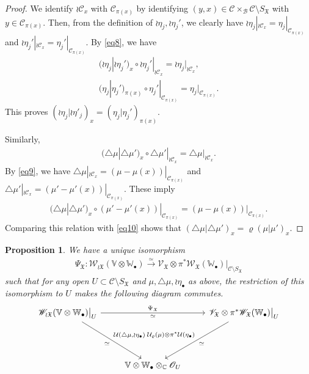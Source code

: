 \documentclass[12pt,a4paper,notitlepage]{article}
\theoremstyle{definition}
\theoremstyle{plain}
\newtheorem{pp}[df]{Proposition}
\newcommand{\fk}{\mathfrak}
\newcommand{\mc}{\mathcal}
\newcommand{\scr}{\mathscr}
\newcommand{\SX}{{S_{\fk X}}}
\newcommand{\blt}{\bullet}
\newcommand{\Vbb}{\mathbb V}
\newcommand{\Wbb}{\mathbb W}
\newcommand{\Cbb}{\mathbb C}
\numberwithin{equation}{section}
\begin{document}
\begin{proof}
We identify $\wr\mc C_x$ with $\mc C_{\pi(x)}$ by identifying $(y,x)\in\mc C\times_{\mc B}\mc C\setminus\SX$ with $y\in\mc C_{\pi(x)}$. Then, from the definition of $\wr\eta_j,\wr\eta_j'$, we clearly have $\wr\eta_j|_{\wr\mc C_x}=\eta_j|_{\mc C_{\pi(x)}}$ and $\wr\eta_j'|_{\wr\mc C_x}=\eta_j'|_{\mc C_{\pi(x)}}$. By \eqref{eq8}, we have
\begin{gather*}
(\wr\eta_j|\wr\eta_j')_x\circ\wr\eta_j'|_{\wr\mc C_x}=\wr\eta_j|_{\wr\mc C_x},\\
(\eta_j|\eta_j')_{\pi(x)}\circ\eta_j'|_{\mc C_{\pi(x)}}=\eta_j|_{\mc C_{\pi(x)}}.
\end{gather*}
This proves $(\wr\eta_j|\wr\eta'_j)_x=(\eta_j|\eta_j')_{\pi(x)}$. 

Similarly, 
\begin{gather*}
(\triangle\mu|\triangle\mu')_x\circ\triangle\mu'|_{\wr\mc C_x}=\triangle\mu|_{\wr\mc C_x}.
\end{gather*}
By \eqref{eq9}, we have $\triangle\mu|_{\wr\mc C_x}=(\mu-\mu(x))|_{\mc C_{\pi(x)}}$ and $\triangle\mu'|_{\wr\mc C_x}=(\mu'-\mu'(x))|_{\mc C_{\pi(x)}}$. These imply
\begin{gather*}
(\triangle\mu|\triangle\mu')_x\circ(\mu'-\mu'(x))|_{\mc C_{\pi(x)}}=(\mu-\mu(x))|_{\mc C_{\pi(x)}}.
\end{gather*}
Comparing this relation with \eqref{eq10} shows that $(\triangle\mu|\triangle\mu')_x=\varrho(\mu|\mu')_x$.
\end{proof}











\begin{pp}\label{lb5}
We have a unique isomorphism
\begin{align}
\Psi_{\fk X}:\scr W_{\wr\fk X}(\Vbb\otimes\Wbb_\blt)\xrightarrow{\simeq} \scr V_{\fk X}\otimes\pi^*\scr W_{\fk X}(\Wbb_\blt)\big|_{\mc C\setminus\SX}\label{eq32}	
\end{align}
such that for any open $U\subset\mc C\setminus\SX$ and $\mu,\triangle\mu,\wr\eta_\blt$ as above, the restriction of this isomorphism to $U$ makes the following diagram commutes.
\begin{equation}
\begin{tikzcd}
\scr W_{\wr\fk X}(\Vbb\otimes\Wbb_\blt)\big|_U \arrow[rr,"\simeq"',"\Psi_{\fk X}"] \arrow[ddr, "\simeq"' ,"{\mc U(\triangle\mu,\wr\eta_\blt)}"]  && \scr V_{\fk X}\otimes\pi^*\scr W_{\fk X}(\Wbb_\blt)\big |_U \arrow[ddl,"\simeq","{\mc U_\varrho(\mu)\otimes\pi^*\mc U(\eta_\blt)}"']\\
{}\\
& \Vbb\otimes\Wbb_\blt\otimes_\Cbb \scr O_U
\end{tikzcd}\label{eq26}	
\end{equation}
\end{pp}
\end{document}

